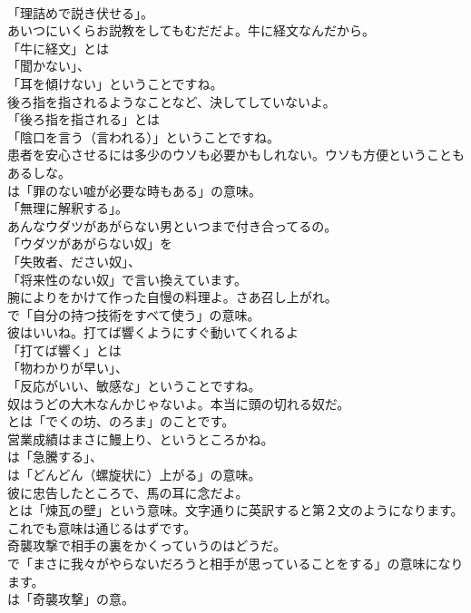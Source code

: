 \documentclass[8pt]{extreport}
\begin{document}
\begin{CJK}{UTF8}{min}
\\	「理詰めで説き伏せる」。	
\\	あいつにいくらお説教をしてもむだだよ。牛に経文なんだから。 
\\	「牛に経文」とは
\\	「聞かない」、
\\	「耳を傾けない」ということですね。	
\\	後ろ指を指されるようなことなど、決してしていないよ。 
\\	「後ろ指を指される」とは
\\	「陰口を言う（言われる）」ということですね。	
\\	患者を安心させるには多少のウソも必要かもしれない。ウソも方便ということもあるしな。 
\\	は「罪のない嘘が必要な時もある」の意味。
\\	「無理に解釈する」。	
\\	あんなウダツがあがらない男といつまで付き合ってるの。 
\\	「ウダツがあがらない奴」を
\\	「失敗者、ださい奴」、
\\	「将来性のない奴」で言い換えています。	
\\	腕によりをかけて作った自慢の料理よ。さあ召し上がれ。 
\\	で「自分の持つ技術をすべて使う」の意味。	
\\	彼はいいね。打てば響くようにすぐ動いてくれるよ 
\\	「打てば響く」とは
\\	「物わかりが早い」、
\\	「反応がいい、敏感な」ということですね。	
\\	奴はうどの大木なんかじゃないよ。本当に頭の切れる奴だ。 
\\	とは「でくの坊、のろま」のことです。	
\\	営業成績はまさに鰻上り、というところかね。 
\\	は「急騰する」、
\\	は「どんどん（螺旋状に）上がる」の意味。	
\\	彼に忠告したところで、馬の耳に念だよ。 
\\	とは「煉瓦の壁」という意味。文字通りに英訳すると第２文のようになります。これでも意味は通じるはずです。	
\\	奇襲攻撃で相手の裏をかくっていうのはどうだ。 
\\	で「まさに我々がやらないだろうと相手が思っていることをする」の意味になります。
\\	は「奇襲攻撃」の意。	

\end{CJK}
\end{document}
